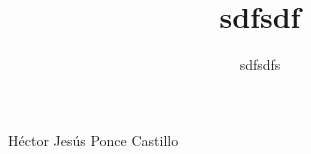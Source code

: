 \documentclass[10pt,letterpaper]{article}
\author{sdfsdfs}
\title{sdfsdf}
\begin{document}
Héctor Jesús Ponce Castillo\\
\end{document}
